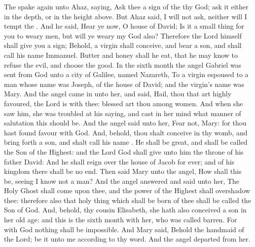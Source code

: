 \clearpage
{}
 The  spake again unto Ahaz, saying, Ask thee a sign of the  thy God; ask it either in the depth, or in the height above. But Ahaz said, I will not ask, neither will I tempt the . And he said, Hear ye now, O house of David; Is it a small thing for you to weary men, but will ye weary my God also? Therefore the Lord himself shall give you a sign; Behold, a virgin shall conceive, and bear a son, and shall call his name Immanuel. Butter and honey shall he eat, that he may know to refuse the evil, and choose the good.
 In the sixth month the angel Gabriel was sent from God unto a city of Galilee, named Nazareth, To a virgin espoused to a man whose name was Joseph, of the house of David; and the virgin's name was Mary. And the angel came in unto her, and said, Hail, thou that art highly favoured, the Lord is with thee: blessed art thou among women. And when she saw him, she was troubled at his saying, and cast in her mind what manner of salutation this should be. And the angel said unto her, Fear not, Mary: for thou hast found favour with God. And, behold, thou shalt conceive in thy womb, and bring forth a son, and shalt call his name . He shall be great, and shall be called the Son of the Highest: and the Lord God shall give unto him the throne of his father David: And he shall reign over the house of Jacob for ever; and of his kingdom there shall be no end. Then said Mary unto the angel, How shall this be, seeing I know not a man? And the angel answered and said unto her, The Holy Ghost shall come upon thee, and the power of the Highest shall overshadow thee: therefore also that holy thing which shall be born of thee shall be called the Son of God. And, behold, thy cousin Elisabeth, she hath also conceived a son in her old age: and this is the sixth month with her, who was called barren. For with God nothing shall be impossible. And Mary said, Behold the handmaid of the Lord; be it unto me according to thy word. And the angel departed from her.

